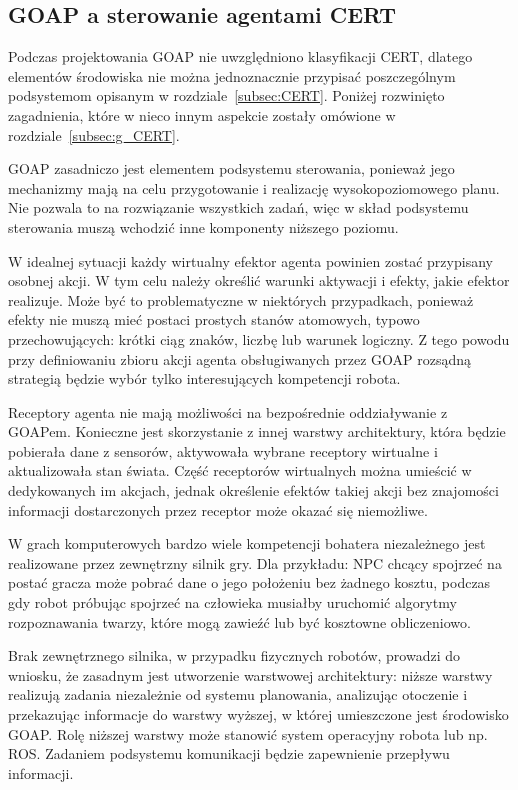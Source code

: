 \subsection{GOAP a sterowanie agentami CERT}
\label{subsec:GOAP_CERT}
Podczas projektowania GOAP nie uwzględniono klasyfikacji CERT, dlatego elementów środowiska nie można jednoznacznie przypisać poszczególnym podsystemom opisanym w rozdziale~\ref{subsec:CERT}. Poniżej rozwinięto zagadnienia, które w nieco innym aspekcie zostały omówione w rozdziale~\ref{subsec:g_CERT}.

GOAP zasadniczo jest elementem podsystemu sterowania, ponieważ jego mechanizmy mają na celu przygotowanie i realizację wysokopoziomowego planu. Nie pozwala to na rozwiązanie wszystkich zadań, więc w skład podsystemu sterowania muszą wchodzić inne komponenty niższego poziomu.

W idealnej sytuacji każdy wirtualny efektor agenta powinien zostać przypisany osobnej akcji. W tym celu należy określić warunki aktywacji i efekty, jakie efektor realizuje. Może być to problematyczne w niektórych przypadkach, ponieważ efekty nie muszą mieć postaci prostych stanów atomowych, typowo przechowujących: krótki ciąg znaków, liczbę lub warunek logiczny. Z tego powodu przy definiowaniu zbioru akcji agenta obsługiwanych przez GOAP rozsądną strategią będzie wybór tylko interesujących kompetencji robota. 

Receptory agenta nie mają możliwości na bezpośrednie oddziaływanie z GOAPem. Konieczne jest skorzystanie z innej warstwy architektury, która będzie pobierała dane z sensorów, aktywowała wybrane receptory wirtualne i aktualizowała stan świata. Część receptorów wirtualnych można umieścić w dedykowanych im akcjach, jednak określenie efektów takiej akcji bez znajomości informacji dostarczonych przez receptor może okazać się niemożliwe.

W grach komputerowych bardzo wiele kompetencji bohatera niezależnego jest realizowane przez zewnętrzny silnik gry. Dla przykładu: NPC chcący spojrzeć na postać gracza może pobrać dane o jego położeniu bez żadnego kosztu, podczas gdy robot próbując spojrzeć na człowieka musiałby uruchomić algorytmy rozpoznawania twarzy, które mogą zawieźć lub być kosztowne obliczeniowo. 

Brak zewnętrznego silnika, w przypadku fizycznych robotów, prowadzi do wniosku, że zasadnym jest utworzenie warstwowej architektury: niższe warstwy realizują zadania niezależnie od systemu planowania, analizując otoczenie i przekazując informacje do warstwy wyższej, w której umieszczone jest środowisko GOAP. Rolę niższej warstwy może stanowić system operacyjny robota lub np. ROS. Zadaniem podsystemu komunikacji będzie zapewnienie przepływu informacji.

